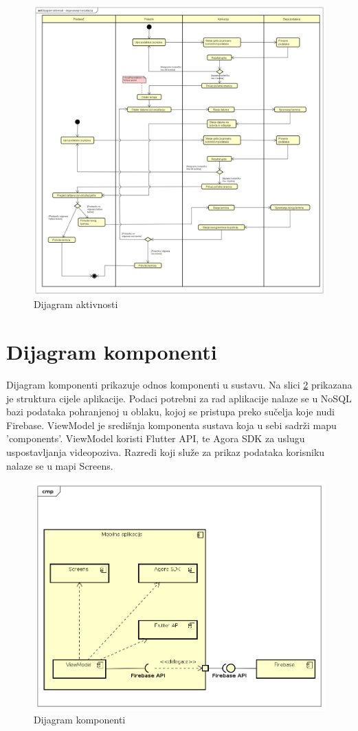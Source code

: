 			\begin{figure}[h]
				\includegraphics[scale=0.35]{dijagrami/Dijagram_aktivnosti.PNG}
				\centering
				\caption{Dijagram aktivnosti}
				\label{fig:Dijagram_aktivnosti}
			\end{figure}
		\eject
			
		\section{Dijagram komponenti}
		
			Dijagram komponenti prikazuje odnos komponenti u sustavu. Na slici \ref{fig:Dijagram_komponenti} prikazana je struktura cijele aplikacije. Podaci potrebni za rad aplikacije nalaze se u NoSQL bazi podataka pohranjenoj u oblaku, kojoj se pristupa preko sučelja koje nudi Firebase. ViewModel je središnja komponenta sustava koja u sebi sadrži mapu 'components'. ViewModel koristi Flutter API, te Agora SDK za uslugu uspostavljanja videopoziva. Razredi koji služe za prikaz podataka korisniku nalaze se u mapi Screens.
			
			\begin{figure}[h]
				\includegraphics[scale=0.6]{dijagrami/Dijagram_komponenti.PNG}
				\centering
				\caption{Dijagram komponenti}
				\label{fig:Dijagram_komponenti}
			\end{figure}